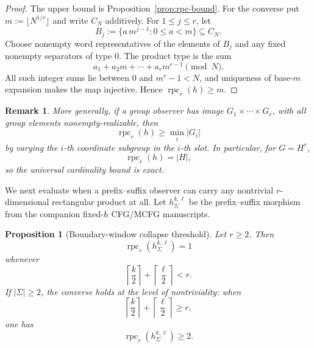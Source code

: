 \documentclass[11pt]{article}
\newtheorem{proposition}[theorem]{Proposition}
\newtheorem{remark}[theorem]{Remark}
\begin{document}
\begin{proof}
The upper bound is Proposition~\ref{prop:rpc-bound}.  For the converse put
\(m:=\lfloor N^{1/r}\rfloor\) and write \(C_N\) additively.  For
\(1\le j\le r\), let
\[
 B_j:=\{a\,m^{j-1}:0\le a<m\}\subseteq C_N.
\]
Choose nonempty word representatives of the elements of \(B_j\) and any
fixed nonempty separators of type \(0\).  The product type is the sum
\[
 a_1+a_2m+\cdots+a_rm^{r-1}\pmod N.
\]
All such integer sums lie between \(0\) and \(m^r-1<N\), and uniqueness of
base-\(m\) expansion makes the map injective. Hence
\(\operatorname{rpc}_r(h)\ge m\).
\end{proof}

\begin{remark}
More generally, if a group observer has image
\(G_1\times\cdots\times G_r\), with all group elements nonempty-realizable,
then
\[
 \operatorname{rpc}_r(h)\ge \min_i |G_i|
\]
by varying the \(i\)-th coordinate subgroup in the \(i\)-th slot.  In
particular, for \(G=H^r\),
\[
 \operatorname{rpc}_r(h)=|H|,
\]
so the universal cardinality bound is exact.
\end{remark}

We next evaluate when a prefix--suffix observer can carry any nontrivial
\(r\)-dimensional rectangular product at all.  Let
\(h_\Sigma^{k,\ell}\) be the prefix--suffix morphism from the companion
fixed-\(h\) CFG/MCFG manuscripts.

\begin{proposition}[Boundary-window collapse threshold]
\label{prop:boundary-collapse}
Let \(r\ge2\). Then
\[
 \operatorname{rpc}_r(h_\Sigma^{k,\ell})=1
\]
whenever
\[
 \left\lceil\frac{k}{2}\right\rceil+
 \left\lceil\frac{\ell}{2}\right\rceil<r.
\]
If \(|\Sigma|\ge2\), the converse holds at the level of nontriviality:
when
\[
 \left\lceil\frac{k}{2}\right\rceil+
 \left\lceil\frac{\ell}{2}\right\rceil\ge r,
\]
one has
\[
 \operatorname{rpc}_r(h_\Sigma^{k,\ell})\ge2.
\]
\end{proposition}
\end{document}
